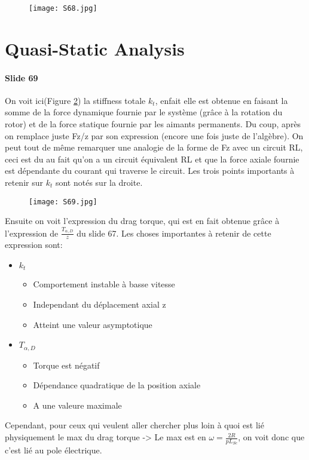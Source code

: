 \begin{figure}[H]
    \centering
    \texttt{[image: S68.jpg]}
    \caption{}
    \label{fig:S68}
\end{figure}




\section{Quasi-Static Analysis}


\paragraph{Slide 69} On voit ici(Figure \ref{fig:S69}) la stiffness totale $k_{t}$, enfait elle est obtenue en faisant la somme de la force dynamique fournie par le système (grâce à la rotation du rotor) et de la force statique fournie par les aimants permanents. Du coup, après on remplace juste Fz/z par son expression (encore une fois juste de l'algèbre). On peut tout de même remarquer une analogie de la forme de Fz avec un circuit RL, ceci est du au fait qu'on a un circuit équivalent RL et que la force axiale fournie est dépendante du courant qui traverse le circuit.
Les trois points importants à retenir sur $k_t$ sont notés sur la droite.




\begin{figure}[H]
    \centering
    \texttt{[image: S69.jpg]}
    \caption{}
    \label{fig:S69}
\end{figure}


Ensuite on voit l'expression du drag torque, qui est en fait obtenue grâce à l'expression de $\frac{T_{\alpha , D}}{z}$ du slide 67. Les choses importantes à retenir de cette expression sont:
\begin{itemize}
    \item $k_t$
    \begin{itemize}
        \item Comportement instable à basse vitesse
        \item Independant du déplacement axial z
        \item Atteint une valeur asymptotique
    \end{itemize}
    \item $T_{\alpha,D}$
    \begin{itemize}
        \item Torque est négatif
        \item Dépendance quadratique de la position axiale
        \item A une valeure maximale 
    \end{itemize}
\end{itemize}
Cependant, pour ceux qui veulent aller chercher plus loin à quoi est lié physiquement le max du drag torque -> Le max est en $\omega = \frac{2R}{pL_{Sc}}$, on voit donc que c'est lié au pole électrique.


